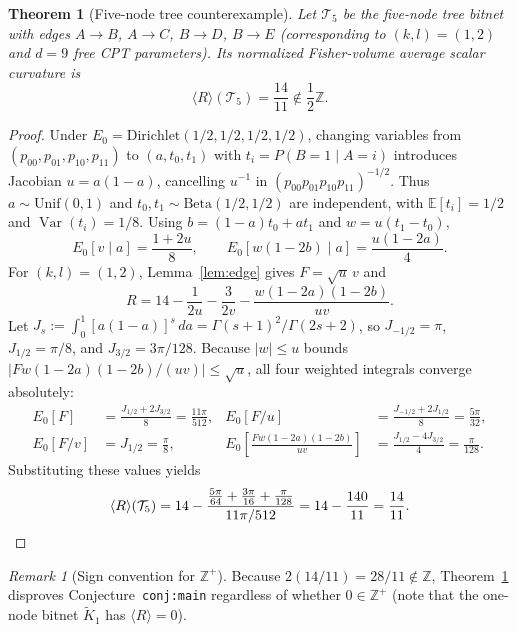 \documentclass[11pt]{article}
\theoremstyle{plain}
\newtheorem{theorem}{Theorem}
\theoremstyle{definition}
\theoremstyle{remark}
\newtheorem{remark}{Remark}
\DeclareMathOperator{\Var}{Var}
\begin{document}
\begin{theorem}[Five-node tree counterexample]\label{thm:five-node}
Let $\mathcal{T}_5$ be the five-node tree bitnet with edges $A \to B$, $A \to C$, $B \to D$, $B \to E$ (corresponding to $(k, l) = (1, 2)$ and $d = 9$ free CPT parameters). Its normalized Fisher-volume average scalar curvature is
\[
\langle R \rangle(\mathcal{T}_5) = \frac{14}{11} \notin \frac{1}{2}\mathbb{Z}.
\]
\end{theorem}

\begin{proof}
Under $E_0 = \mathrm{Dirichlet}(1/2, 1/2, 1/2, 1/2)$, changing variables from $(p_{00}, p_{01}, p_{10}, p_{11})$ to $(a, t_0, t_1)$ with $t_i = P(B=1 \mid A=i)$ introduces Jacobian $u = a(1-a)$, cancelling $u^{-1}$ in $(p_{00}p_{01}p_{10}p_{11})^{-1/2}$. Thus $a \sim \mathrm{Unif}(0, 1)$ and $t_0, t_1 \sim \mathrm{Beta}(1/2, 1/2)$ are independent, with $\mathbb{E}[t_i] = 1/2$ and $\Var(t_i) = 1/8$. Using $b = (1-a)t_0 + a t_1$ and $w = u(t_1 - t_0)$,
\[
E_0[v \mid a] = \frac{1 + 2u}{8}, \qquad E_0[w(1 - 2b) \mid a] = \frac{u(1 - 2a)}{4}.
\]
For $(k, l) = (1, 2)$, Lemma~\ref{lem:edge} gives $F = \sqrt{u}\,v$ and
\[
R = 14 - \frac{1}{2u} - \frac{3}{2v} - \frac{w(1-2a)(1-2b)}{uv}.
\]
Let $J_s := \int_0^1 [a(1-a)]^s\,da = \Gamma(s+1)^2/\Gamma(2s+2)$, so $J_{-1/2} = \pi$, $J_{1/2} = \pi/8$, and $J_{3/2} = 3\pi/128$. Because $|w| \le u$ bounds $|Fw(1-2a)(1-2b)/(uv)| \le \sqrt{u}$, all four weighted integrals converge absolutely:
\begin{align*}
E_0[F] &= \frac{J_{1/2} + 2J_{3/2}}{8} = \frac{11\pi}{512}, &
E_0[F/u] &= \frac{J_{-1/2} + 2J_{1/2}}{8} = \frac{5\pi}{32}, \\
E_0[F/v] &= J_{1/2} = \frac{\pi}{8}, &
E_0\!\left[\frac{Fw(1-2a)(1-2b)}{uv}\right] &= \frac{J_{1/2} - 4J_{3/2}}{4} = \frac{\pi}{128}.
\end{align*}
Substituting these values yields
\[
\langle R \rangle(\mathcal{T}_5) = 14 - \frac{\frac{5\pi}{64} + \frac{3\pi}{16} + \frac{\pi}{128}}{11\pi/512}
= 14 - \frac{140}{11} = \frac{14}{11}. \qedhere
\]
\end{proof}

\begin{remark}[Sign convention for $\mathbb{Z}^+$]
Because $2(14/11) = 28/11 \notin \mathbb{Z}$, Theorem~\ref{thm:five-node} disproves Conjecture~\texttt{conj:main} regardless of whether $0 \in \mathbb{Z}^+$ (note that the one-node bitnet $\tilde{K}_1$ has $\langle R \rangle = 0$).
\end{remark}
\end{document}
